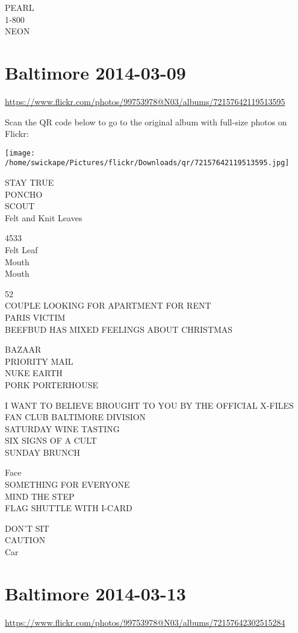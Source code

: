 \documentclass[10pt,letterpaper]{article}
\begin{document}
PEARL\\
1{-}800\\
NEON


\section*{Baltimore 2014-03-09}

\url{https://www.flickr.com/photos/99753978@N03/albums/72157642119513595}

Scan the QR code below to go to the original album with full-size photos on Flickr:

\texttt{[image: /home/swickape/Pictures/flickr/Downloads/qr/72157642119513595.jpg]}


STAY TRUE\\
PONCHO\\
SCOUT\\
Felt and Knit Leaves

4533\\
Felt Leaf\\
Mouth\\
Mouth

52\\
COUPLE LOOKING FOR APARTMENT FOR RENT\\
PARIS VICTIM\\
BEEFBUD HAS MIXED FEELINGS ABOUT CHRISTMAS

BAZAAR\\
PRIORITY MAIL\\
NUKE EARTH\\
PORK PORTERHOUSE

I WANT TO BELIEVE BROUGHT TO YOU BY THE OFFICIAL X{-}FILES FAN CLUB BALTIMORE DIVISION\\
SATURDAY WINE TASTING\\
SIX SIGNS OF A CULT\\
SUNDAY BRUNCH

Face\\
SOMETHING FOR EVERYONE\\
MIND THE STEP\\
FLAG SHUTTLE WITH I{-}CARD

DON'T SIT\\
CAUTION\\
Car


\section*{Baltimore 2014-03-13}

\url{https://www.flickr.com/photos/99753978@N03/albums/72157642302515284}
\end{document}
